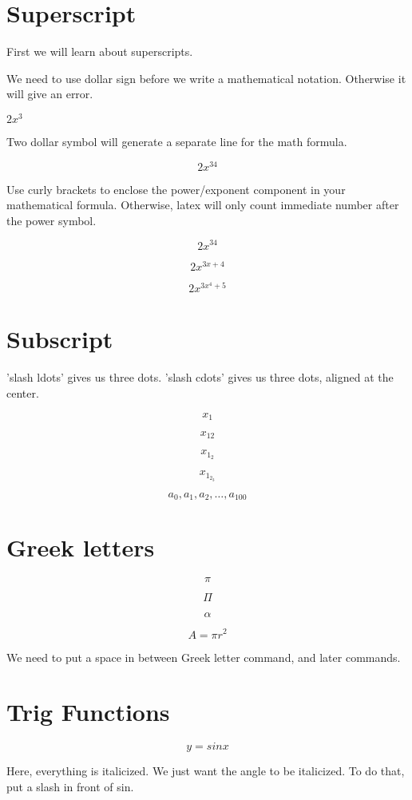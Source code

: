 \documentclass[11pt]{article}
\begin{document}
\section{Superscript}

First we will learn about superscripts.

We need to use dollar sign before we write a mathematical notation. Otherwise it will give an error. 

$2x^3$

Two dollar symbol will generate a separate line for the math formula. 

$$ 2x^34 $$

Use curly brackets to enclose the power/exponent component in your mathematical
formula. Otherwise, latex will only count immediate number after the power
symbol. 

$$ 2x^{34} $$

$$ 2x^{3x+4} $$

$$ 2x^{3x^4 +5}  $$

\section{Subscript}

'slash ldots' gives us three dots.
'slash cdots' gives us three dots, aligned at the center.


$$ x_1 $$

$$ x_{12} $$

$$ x_{1_2} $$

$$ x_{1_{2_3}} $$

$$ a_0, a_1, a_2, \ldots, a_{100} $$

\section{Greek letters}

$$ \pi $$

$$ \Pi $$

$$ \alpha $$ 

$$ A = \pi r^2 $$

We need to put a space in between Greek letter command, and later commands. 

\section{Trig Functions}

$$ y = sinx $$

Here, everything is italicized. We just want the angle to be italicized. To do that, put a slash in front of sin. 
\end{document}
